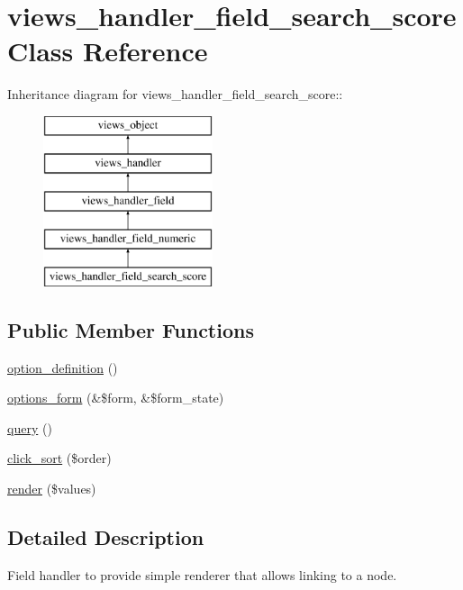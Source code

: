 \hypertarget{classviews__handler__field__search__score}{
\section{views\_\-handler\_\-field\_\-search\_\-score Class Reference}
\label{classviews__handler__field__search__score}
}
Inheritance diagram for views\_\-handler\_\-field\_\-search\_\-score::\begin{figure}[H]
\begin{center}
\leavevmode
\includegraphics[height=5cm]{classviews__handler__field__search__score}
\end{center}
\end{figure}
\subsection*{Public Member Functions}
\begin{CompactItemize}
\item 
\hyperlink{classviews__handler__field__search__score_ac88046a858aad74c178cd019b2f236b}{option\_\-definition} ()
\item 
\hyperlink{classviews__handler__field__search__score_d3bc7dfcc4859869b75b371c33380abb}{options\_\-form} (\&\$form, \&\$form\_\-state)
\item 
\hyperlink{classviews__handler__field__search__score_fda75fb726345ee91401d2f79ad2d313}{query} ()
\item 
\hyperlink{classviews__handler__field__search__score_b3ddf2a010848822c751a774f5bf9a67}{click\_\-sort} (\$order)
\item 
\hyperlink{classviews__handler__field__search__score_80a58d69b8a6c7f57da022e88f90e32d}{render} (\$values)
\end{CompactItemize}


\subsection{Detailed Description}
Field handler to provide simple renderer that allows linking to a node. 

